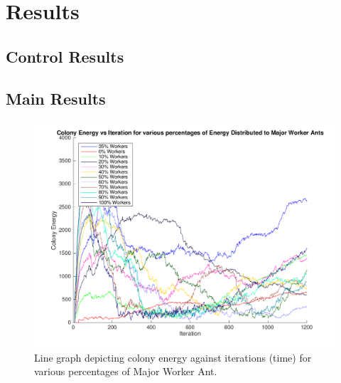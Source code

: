 \section{Results}
\subsection{Control Results}

\subsection{Main Results}

\begin{figure}[H]
  \centering
  \includegraphics[width=1\textwidth]{images/line-graph-results.png}
  \caption{Line graph depicting colony energy against iterations (time) for various percentages of Major Worker Ant.}
  \label{fig:iters-line}
\end{figure}

